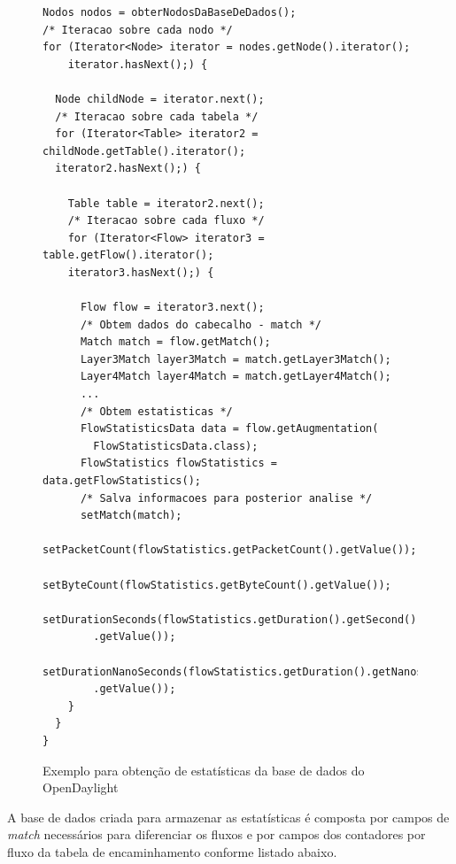 \begin{figure}[H]
  \centering
  \caption{Exemplo para obtenção de estatísticas da base de dados do OpenDaylight}
\begin{lstlisting}[belowskip=-0.05 \baselineskip]
Nodos nodos = obterNodosDaBaseDeDados();
/* Iteracao sobre cada nodo */
for (Iterator<Node> iterator = nodes.getNode().iterator(); 
    iterator.hasNext();) {
  
  Node childNode = iterator.next();
  /* Iteracao sobre cada tabela */
  for (Iterator<Table> iterator2 = childNode.getTable().iterator();
  iterator2.hasNext();) {
    
    Table table = iterator2.next();
    /* Iteracao sobre cada fluxo */
    for (Iterator<Flow> iterator3 = table.getFlow().iterator(); 
    iterator3.hasNext();) {
      
      Flow flow = iterator3.next();
      /* Obtem dados do cabecalho - match */
      Match match = flow.getMatch();
      Layer3Match layer3Match = match.getLayer3Match();
      Layer4Match layer4Match = match.getLayer4Match();
      ...
      /* Obtem estatisticas */
      FlowStatisticsData data = flow.getAugmentation(
        FlowStatisticsData.class);
      FlowStatistics flowStatistics = data.getFlowStatistics();
      /* Salva informacoes para posterior analise */
      setMatch(match);
      setPacketCount(flowStatistics.getPacketCount().getValue());
      setByteCount(flowStatistics.getByteCount().getValue());
      setDurationSeconds(flowStatistics.getDuration().getSecond()
        .getValue());
      setDurationNanoSeconds(flowStatistics.getDuration().getNanosecond()
        .getValue());
    }
  }
}
\end{lstlisting}
\label{cod:code-colection}
\end{figure}

A base de dados criada para armazenar as estatísticas é composta por campos de \textit{match} necessários para diferenciar os fluxos e por campos dos contadores por fluxo da tabela de encaminhamento conforme listado abaixo.

